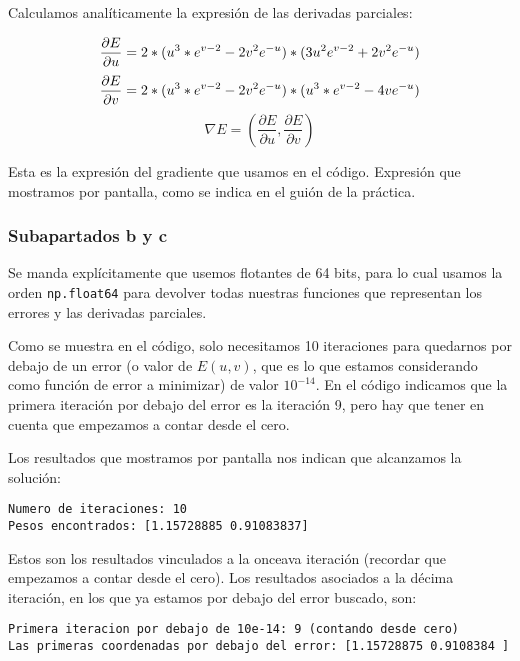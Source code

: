 \documentclass[11pt]{article}
\begin{document}
Calculamos analíticamente la expresión de las derivadas parciales:

\begin{displaymath}
    \frac{\partial E}{\partial u} = 2 * (u^3 * e^{v-2} - 2v^2 e^{-u}) * (3u^2 e^{v-2} + 2v^2 e^{-u}) \\
\end{displaymath}
\begin{displaymath}
    \frac{\partial E}{\partial v} = 2 * (u^3 * e^{v-2} - 2v^2 e^{-u}) * (u^3 * e^{v-2} - 4v e^{-u})  \\
\end{displaymath}
\begin{displaymath}
    \nabla E = (\frac{\partial E}{\partial u}, \frac{\partial E}{\partial v})
\end{displaymath}

Esta es la expresión del gradiente que usamos en el código. Expresión que mostramos por pantalla, como se indica en el guión de la práctica.

\subsubsection{Subapartados b y c}

Se manda explícitamente que usemos flotantes de 64 bits, para lo cual usamos la orden \lstinline{np.float64} para devolver todas nuestras funciones que representan los errores y las derivadas parciales.

Como se muestra en el código, solo necesitamos 10 iteraciones para quedarnos por debajo de un error (o valor de $E(u, v)$, que es lo que estamos considerando como función de error a minimizar) de valor $10^{-14}$. En el código indicamos que la primera iteración por debajo del error es la iteración 9, pero hay que tener en cuenta que empezamos a contar desde el cero.

Los resultados que mostramos por pantalla nos indican que alcanzamos la solución:

\begin{verbatim}
Numero de iteraciones: 10
Pesos encontrados: [1.15728885 0.91083837]
\end{verbatim}

Estos son los resultados vinculados a la onceava iteración (recordar que empezamos a contar desde el cero). Los resultados asociados a la décima iteración, en los que ya estamos por debajo del error buscado, son:

\begin{verbatim}
Primera iteracion por debajo de 10e-14: 9 (contando desde cero)
Las primeras coordenadas por debajo del error: [1.15728875 0.9108384 ]
\end{verbatim}
\end{document}
